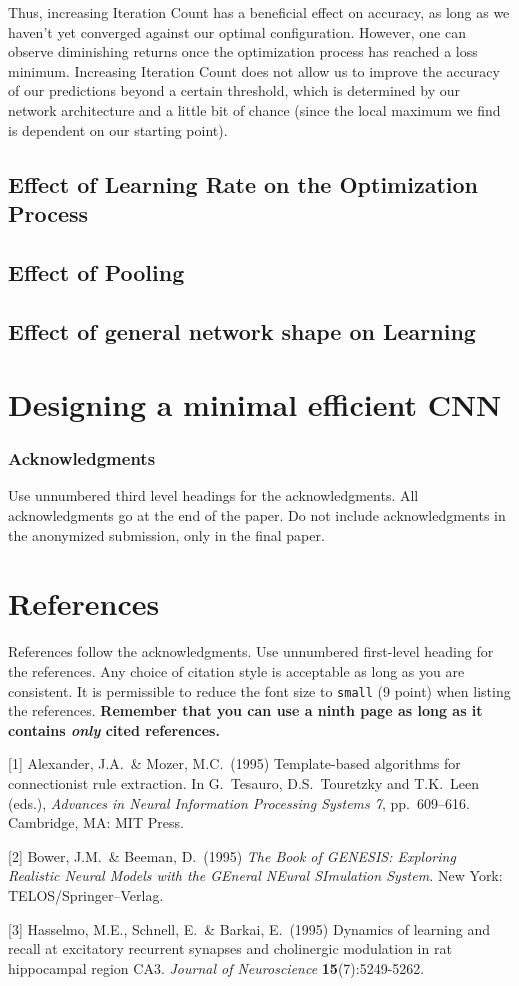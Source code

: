 \documentclass{article}
\begin{document}
Thus, increasing Iteration Count has a beneficial effect on accuracy, as long as we haven't yet converged against our optimal configuration. However, one can observe diminishing returns once the optimization process has reached a loss minimum. Increasing Iteration Count does not allow us to improve the accuracy of our predictions beyond a certain threshold, which is determined by our network architecture and a little bit of chance (since the local maximum we find is dependent on our starting point).
\subsection{Effect of Learning Rate on the Optimization Process}
\subsection{Effect of Pooling}
\subsection{Effect of general network shape on Learning}

\section{Designing a minimal efficient CNN}



\subsubsection*{Acknowledgments}

Use unnumbered third level headings for the acknowledgments. All
acknowledgments go at the end of the paper. Do not include
acknowledgments in the anonymized submission, only in the final paper.

\section*{References}

References follow the acknowledgments. Use unnumbered first-level
heading for the references. Any choice of citation style is acceptable
as long as you are consistent. It is permissible to reduce the font
size to \verb+small+ (9 point) when listing the references. {\bf
  Remember that you can use a ninth page as long as it contains
  \emph{only} cited references.}
\medskip

\small

[1] Alexander, J.A.\ \& Mozer, M.C.\ (1995) Template-based algorithms
for connectionist rule extraction. In G.\ Tesauro, D.S.\ Touretzky and
T.K.\ Leen (eds.), {\it Advances in Neural Information Processing
  Systems 7}, pp.\ 609--616. Cambridge, MA: MIT Press.

[2] Bower, J.M.\ \& Beeman, D.\ (1995) {\it The Book of GENESIS:
  Exploring Realistic Neural Models with the GEneral NEural SImulation
  System.}  New York: TELOS/Springer--Verlag.

[3] Hasselmo, M.E., Schnell, E.\ \& Barkai, E.\ (1995) Dynamics of
learning and recall at excitatory recurrent synapses and cholinergic
modulation in rat hippocampal region CA3. {\it Journal of
  Neuroscience} {\bf 15}(7):5249-5262.
\end{document}
